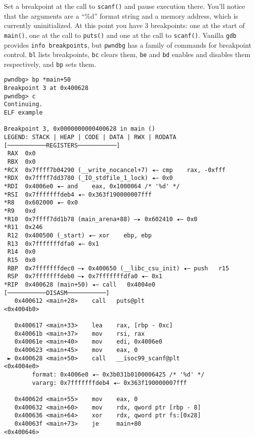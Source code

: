 Set a breakpoint at the call to \texttt{scanf()} and pause execution there.
You'll notice that the arguments are a ``\%d'' format string and a memory
address, which is currently uninitialized. At this point you have 3 breakpoints:
one at the start of \texttt{main()}, one at the call to \texttt{puts()} and one
at the call to \texttt{scanf()}. Vanilla \texttt{gdb} provides \texttt{info
breakpoints}, but \texttt{pwndbg} has a family of commands for breakpoint
control. \texttt{bl} lists breakpoints, \texttt{bc} clears them,
\texttt{be} and \texttt{bd} enables and disables them respectively, and
\texttt{bp} sets them.

\begin{lstlisting}
pwndbg> bp *main+50
Breakpoint 3 at 0x400628
pwndbg> c
Continuing.
ELF example

Breakpoint 3, 0x0000000000400628 in main ()
LEGEND: STACK | HEAP | CODE | DATA | RWX | RODATA
[───────────REGISTERS───────────]
 RAX  0x0
 RBX  0x0
*RCX  0x7ffff7b04290 (__write_nocancel+7) ◂— cmp    rax, -0xfff
*RDX  0x7ffff7dd3780 (_IO_stdfile_1_lock) ◂— 0x0
*RDI  0x4006e0 ◂— and    eax, 0x1000064 /* '%d' */
*RSI  0x7fffffffdeb4 ◂— 0x363f190000007fff
*R8   0x602000 ◂— 0x0
*R9   0xd
*R10  0x7ffff7dd1b78 (main_arena+88) —▸ 0x602410 ◂— 0x0
*R11  0x246
 R12  0x400500 (_start) ◂— xor    ebp, ebp
 R13  0x7fffffffdfa0 ◂— 0x1
 R14  0x0
 R15  0x0
 RBP  0x7fffffffdec0 —▸ 0x400650 (__libc_csu_init) ◂— push   r15
 RSP  0x7fffffffdeb0 —▸ 0x7fffffffdfa0 ◂— 0x1
*RIP  0x400628 (main+50) ◂— call   0x4004e0
[───────────DISASM───────────]
   0x400612 <main+28>    call   puts@plt                      <0x4004b0>
 
   0x400617 <main+33>    lea    rax, [rbp - 0xc]
   0x40061b <main+37>    mov    rsi, rax
   0x40061e <main+40>    mov    edi, 0x4006e0
   0x400623 <main+45>    mov    eax, 0
 ► 0x400628 <main+50>    call   __isoc99_scanf@plt            <0x4004e0>
        format: 0x4006e0 ◂— 0x3b031b0100006425 /* '%d' */
        vararg: 0x7fffffffdeb4 ◂— 0x363f190000007fff
 
   0x40062d <main+55>    mov    eax, 0
   0x400632 <main+60>    mov    rdx, qword ptr [rbp - 8]
   0x400636 <main+64>    xor    rdx, qword ptr fs:[0x28]
   0x40063f <main+73>    je     main+80                       <0x400646>
 

\end{lstlisting}
